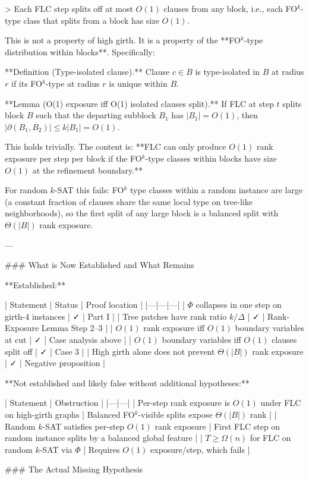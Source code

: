 > Each FLC step splits off at most $O(1)$ clauses from any block, i.e., each FO$^k$-type class that splits from a block has size $O(1)$.

This is not a property of high girth. It is a property of the **FO$^k$-type distribution within blocks**. Specifically:

**Definition (Type-isolated clause).** Clause $c \in B$ is type-isolated in $B$ at radius $r$ if its FO$^k$-type at radius $r$ is unique within $B$.

**Lemma (O(1) exposure iff O(1) isolated clauses split).** If FLC at step $t$ splits block $B$ such that the departing subblock $B_1$ has $|B_1| = O(1)$, then $|\partial(B_1, B_2)| \leq k|B_1| = O(1)$.

This holds trivially. The content is: **FLC can only produce $O(1)$ rank exposure per step per block if the FO$^k$-type classes within blocks have size $O(1)$ at the refinement boundary.**

For random $k$-SAT this fails: FO$^k$ type classes within a random instance are large (a constant fraction of clauses share the same local type on tree-like neighborhoods), so the first split of any large block is a balanced split with $\Theta(|B|)$ rank exposure.

---

### What is Now Established and What Remains

**Established:**

| Statement | Status | Proof location |
|---|---|---|
| $\Phi$ collapses in one step on girth-4 instances | ✓ | Part I |
| Tree patches have rank ratio $k/\Delta$ | ✓ | Rank-Exposure Lemma Step 2–3 |
| $O(1)$ rank exposure iff $O(1)$ boundary variables at cut | ✓ | Case analysis above |
| $O(1)$ boundary variables iff $O(1)$ clauses split off | ✓ | Case 3 |
| High girth alone does not prevent $\Theta(|B|)$ rank exposure | ✓ | Negative proposition |

**Not established and likely false without additional hypotheses:**

| Statement | Obstruction |
|---|---|
| Per-step rank exposure is $O(1)$ under FLC on high-girth graphs | Balanced FO$^k$-visible splits expose $\Theta(|B|)$ rank |
| Random $k$-SAT satisfies per-step $O(1)$ rank exposure | First FLC step on random instance splits by a balanced global feature |
| $T \geq \Omega(n)$ for FLC on random $k$-SAT via $\Phi$ | Requires $O(1)$ exposure/step, which fails |

### The Actual Missing Hypothesis

